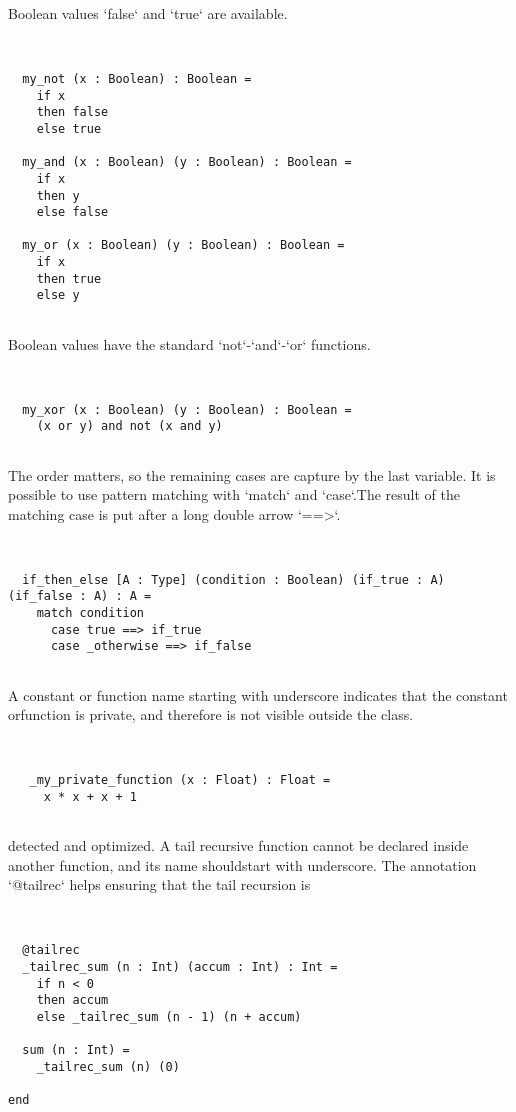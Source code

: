 \documentclass[12pt,a4paper]{article}
\begin{document}
Boolean values `false` and `true` are available. 


\begin{lstlisting}


  my_not (x : Boolean) : Boolean =
    if x
    then false
    else true

  my_and (x : Boolean) (y : Boolean) : Boolean =
    if x
    then y
    else false

  my_or (x : Boolean) (y : Boolean) : Boolean =
    if x
    then true
    else y


\end{lstlisting}

Boolean values have the standard `not`-`and`-`or` functions. 


\begin{lstlisting}


  my_xor (x : Boolean) (y : Boolean) : Boolean =
    (x or y) and not (x and y)


\end{lstlisting}

The order matters, so the remaining cases are capture by the last variable. It is possible to use pattern matching with `match` and `case`.The result of the matching case is put after a long double arrow `==>`.


\begin{lstlisting}


  if_then_else [A : Type] (condition : Boolean) (if_true : A) (if_false : A) : A =
    match condition
      case true ==> if_true
      case _otherwise ==> if_false


\end{lstlisting}

A constant or function name starting with underscore indicates that the constant orfunction is private, and therefore is not visible outside the class. 


\begin{lstlisting}


   _my_private_function (x : Float) : Float =
     x * x + x + 1


\end{lstlisting}

detected and optimized. A tail recursive function cannot be declared inside another function, and its name shouldstart with underscore. The annotation `@tailrec` helps ensuring that the tail recursion is


\begin{lstlisting}


  @tailrec
  _tailrec_sum (n : Int) (accum : Int) : Int =
    if n < 0
    then accum
    else _tailrec_sum (n - 1) (n + accum)

  sum (n : Int) =
    _tailrec_sum (n) (0)

end


\end{lstlisting}
\end{document}
